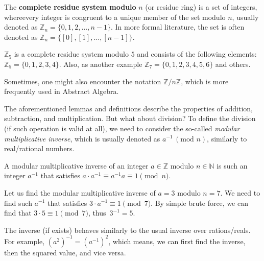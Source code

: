 \documentclass[../lecture-notes-148x210.tex]{subfiles}
\begin{document}
\begin{definition}
    The \textbf{complete residue system modulo} $n$ (or residue ring) is a set of integers, 
    whereevery integer is congruent to a unique member of the set modulo $n$, usually 
    denoted as $\mathbb{Z}_n = \{0, 1, 2, \dots, n-1\}$. 
    In more formal literature, the set is often denoted as $\mathbb{Z}_n = \{ [0], [1], \ldots, [n-1] \}$.
\end{definition}

\begin{example}
    $\mathbb{Z}_{5}$ is a complete residue system modulo $5$ and consists of the following elements: $\mathbb{Z}_5 = \{0, 1, 2, 3, 4\}$.
    Also, as another example $\mathbb{Z}_{7} = \{0, 1, 2, 3, 4, 5, 6\}$ and others.
\end{example}

\begin{remark}
    Sometimes, one might also encounter the notation $\mathbb{Z}/n\mathbb{Z}$, which is more frequently used in Abstract Algebra.
\end{remark}

The aforementioned lemmas and definitions describe the properties of addition, subtraction, and multiplication. But what about division? To define the division (if such operation is valid at all), we need to consider the so-called \emph{modular multiplicative inverse}, which is usually denoted as $a^{-1} \, (\text{mod } n)$, similarly to real/rational numbers.

\begin{definition}
    A modular multiplicative inverse of an integer $a \in \mathbb{Z}$ modulo $n \in \mathbb{N}$ is such an integer $a^{-1}$ that satisfies $a \cdot a^{-1} \equiv a^{-1}a \equiv 1 \pmod{n}$.
\end{definition}

\begin{example}
    Let us find the modular multiplicative inverse of $a = 3$ modulo $n = 7$.
    We need to find such $a^{-1}$ that satisfies $3 \cdot a^{-1} \equiv 1 \pmod{7}$.
    By simple brute force, we can find that $3 \cdot 5 \equiv 1 \pmod{7}$, thus~$3^{-1} = 5$.
\end{example}

\begin{remark}
    The inverse (if exists) behaves similarly to the usual inverse over rations/reals. For example, $(a^{2})^{-1} = (a^{-1})^{2}$, which means, we can first find the inverse, then the squared value, and vice versa.
\end{remark}
\end{document}
